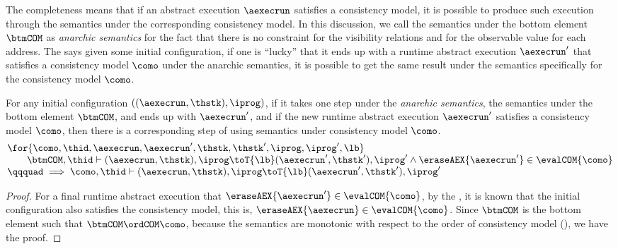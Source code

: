 The completeness means that if an abstract execution \( \aexecrun \) satisfies a consistency model, it is possible to produce such execution through the semantics under the corresponding consistency model.
In this discussion, we call the semantics under the bottom element \( \btmCOM \) as \emph{anarchic semantics} for the fact that there is no constraint for the visibility relations and for the observable value for each address.
The  says given some initial configuration, if one is ``lucky'' that it ends up with a runtime abstract execution \( \aexecrun'\) that satisfies a consistency model \( \como \) under the anarchic semantics, it is possible to get the same result under the semantics specifically for the consistency model \( \como \).

\begin{thm}
\label{thm:semantics-completeness}
For any initial configuration \( ( (\aexecrun, \thstk), \iprog ) \), if it takes one step under the \emph{anarchic semantics}, \ie the semantics under the bottom element \( \btmCOM \), and ends up with \( \aexecrun' \), and if the new runtime abstract execution \( \aexecrun' \) satisfies a consistency model \( \como \), then there is a corresponding step of using semantics under consistency model \( \como \).
 \[
 \begin{array}{@{}l@{}}
    \for{\como, \thid, \aexecrun, \aexecrun', \thstk, \thstk', \iprog, {\iprog}', \lb} \\
    \qquad \btmCOM, \thid \vdash (\aexecrun, \thstk), \iprog \toT{\lb} (\aexecrun', \thstk'), {\iprog}' \land \eraseAEX{\aexecrun'} \in \evalCOM{\como} \\
    \qqquad \implies \como, \thid \vdash (\aexecrun, \thstk), \iprog \toT{\lb} (\aexecrun', \thstk'), {\iprog}' 
 \end{array}
 \]
\end{thm}
\begin{proof}
For a final runtime abstract execution that \( \eraseAEX{\aexecrun'} \in \evalCOM{\como} \), by the , it is known that the initial configuration also satisfies the consistency model, this is, \( \eraseAEX{\aexecrun} \in \evalCOM{\como} \).
Since \( \btmCOM \) is the bottom element such that \( \btmCOM \ordCOM \como \), because the semantics are monotonic with respect to the order of consistency model (), we have the proof.
\end{proof}
